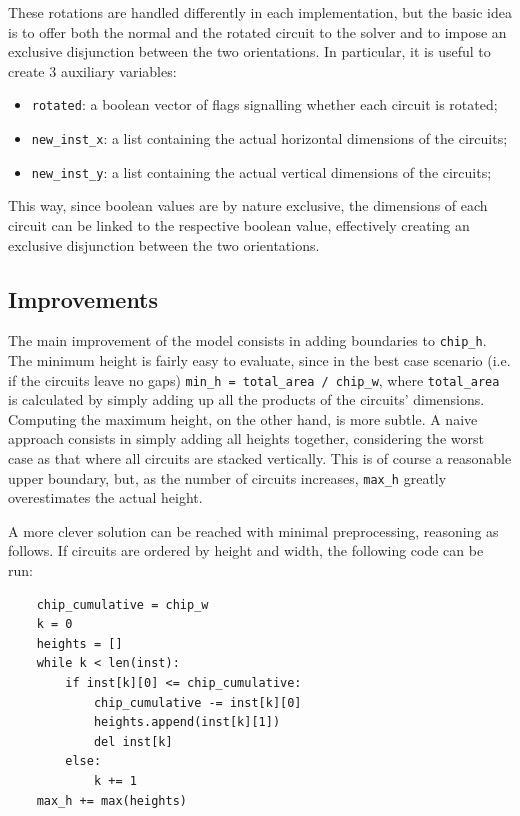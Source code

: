 \documentclass[a4paper, 12pt]{article}
\begin{document}
These rotations are handled differently in each implementation, but the basic idea is to offer both the normal and the rotated circuit to the solver and to impose an exclusive disjunction between the two orientations. In particular, it is useful to create 3 auxiliary variables:

\begin{itemize}
    \item \verb|rotated|: a boolean vector of flags signalling whether each circuit is rotated;
    \item \verb|new_inst_x|: a list containing the actual horizontal dimensions of the circuits;
    \item \verb|new_inst_y|: a list containing the actual vertical dimensions of the circuits;
\end{itemize}

This way, since boolean values are by nature exclusive, the dimensions of each circuit can be linked to the respective boolean value, effectively creating an exclusive disjunction between the two orientations.


\subsection{Improvements}\label{sec:improvements}

The main improvement of the model consists in adding boundaries to \verb|chip_h|. The minimum height is fairly easy to evaluate, since in the best case scenario (i.e. if the circuits leave no gaps) \verb|min_h = total_area / chip_w|, where \verb|total_area| is calculated by simply adding up all the products of the circuits' dimensions. Computing the maximum height, on the other hand, is more subtle. A naive approach consists in simply adding all heights together, considering the worst case as that where all circuits are stacked vertically. This is of course a reasonable upper boundary, but, as the number of circuits increases, \verb|max_h| greatly overestimates the actual height.

A more clever solution can be reached with minimal preprocessing, reasoning as follows. If circuits are ordered by height and width, the following code can be run:
\begin{verbatim}
    chip_cumulative = chip_w
    k = 0
    heights = []
    while k < len(inst):
        if inst[k][0] <= chip_cumulative:
            chip_cumulative -= inst[k][0]
            heights.append(inst[k][1])
            del inst[k]
        else:
            k += 1
    max_h += max(heights)
\end{verbatim}
\end{document}
